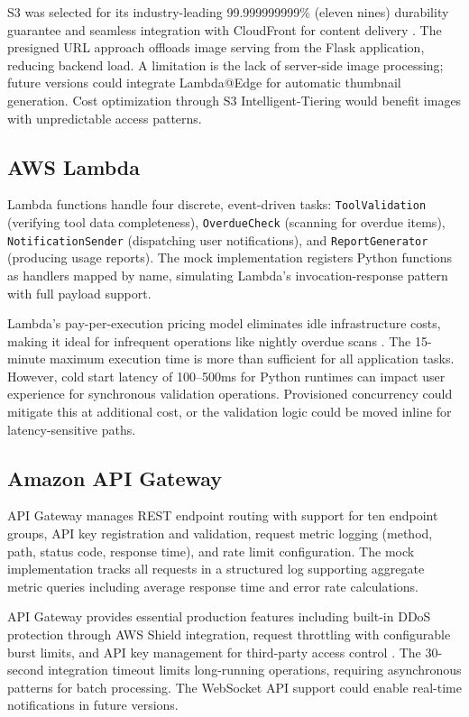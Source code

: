 \documentclass[conference]{IEEEtran}
\begin{document}
S3 was selected for its industry-leading 99.999999999\% (eleven nines) durability guarantee and seamless integration with CloudFront for content delivery \cite{aws_s3}. The presigned URL approach offloads image serving from the Flask application, reducing backend load. A limitation is the lack of server-side image processing; future versions could integrate Lambda@Edge for automatic thumbnail generation. Cost optimization through S3 Intelligent-Tiering would benefit images with unpredictable access patterns.

\subsection{AWS Lambda}
Lambda functions handle four discrete, event-driven tasks: \texttt{ToolValidation} (verifying tool data completeness), \texttt{OverdueCheck} (scanning for overdue items), \texttt{NotificationSender} (dispatching user notifications), and \texttt{ReportGenerator} (producing usage reports). The mock implementation registers Python functions as handlers mapped by name, simulating Lambda's invocation-response pattern with full payload support.

Lambda's pay-per-execution pricing model eliminates idle infrastructure costs, making it ideal for infrequent operations like nightly overdue scans \cite{aws_lambda}. The 15-minute maximum execution time is more than sufficient for all application tasks. However, cold start latency of 100--500ms for Python runtimes can impact user experience for synchronous validation operations. Provisioned concurrency could mitigate this at additional cost, or the validation logic could be moved inline for latency-sensitive paths.

\subsection{Amazon API Gateway}
API Gateway manages REST endpoint routing with support for ten endpoint groups, API key registration and validation, request metric logging (method, path, status code, response time), and rate limit configuration. The mock implementation tracks all requests in a structured log supporting aggregate metric queries including average response time and error rate calculations.

API Gateway provides essential production features including built-in DDoS protection through AWS Shield integration, request throttling with configurable burst limits, and API key management for third-party access control \cite{aws_apigateway}. The 30-second integration timeout limits long-running operations, requiring asynchronous patterns for batch processing. The WebSocket API support could enable real-time notifications in future versions.
\end{document}

